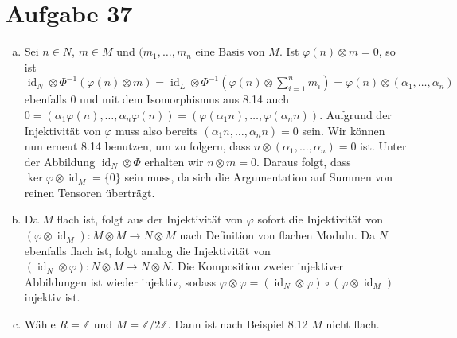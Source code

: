 \documentclass{article}
\theoremstyle{definition}
\newcommand{\Z}{\mathbb{Z}}
\newcommand{\id}{\operatorname{id}}
\begin{document}
\section*{Aufgabe 37}
\begin{enumerate}[(a)]
    \item Sei $n\in N$, $m\in M$ und $(m_1,\dots,m_n$ eine Basis von $M$. Ist $\varphi(n)\otimes m = 0$, so ist $\id_N\otimes\Phi^{-1}(\varphi(n)\otimes m) =  \id_L\otimes\Phi^{-1}(\varphi(n)\otimes \sum_{i = 1}^{n}m_i) = \varphi(n)\otimes (\alpha_1,\dots,\alpha_n)$ ebenfalls $0$ und mit dem Isomorphismus aus 8.14 auch $0 = (\alpha_1 \varphi(n), \dots, \alpha_n \varphi(n)) = (\varphi(\alpha_1 n), \dots, \varphi(\alpha_n n))$. Aufgrund der Injektivität von $\varphi$ muss also bereits $(\alpha_1 n, \dots, \alpha_n n) = 0$ sein. Wir können nun erneut 8.14 benutzen, um zu folgern, dass $n \otimes (\alpha_1,\dots,\alpha_n) = 0$ ist. Unter der Abbildung $\id_N\otimes\Phi$ erhalten wir $n\otimes m = 0$. Daraus folgt, dass $\ker \varphi \otimes \id_M = \{0\}$ sein muss, da sich die Argumentation auf Summen von reinen Tensoren überträgt.
    \item Da $M$ flach ist, folgt aus der Injektivität von $\varphi$ sofort die Injektivität von $(\varphi \otimes \id_M)\colon M\otimes M \to N\otimes M$ nach Definition von flachen Moduln. Da $N$ ebenfalls flach ist, folgt analog die Injektivität von $(\id_N \otimes \varphi)\colon N\otimes M \to N\otimes N$. Die Komposition zweier injektiver Abbildungen ist wieder injektiv, sodass $\varphi \otimes \varphi = (\id_N \otimes \varphi) \circ (\varphi \otimes \id_M)$ injektiv ist.
    \item Wähle $R = \Z$ und $M= \Z /2\Z$. Dann ist nach Beispiel 8.12 $M$ nicht flach.
\end{enumerate}
\end{document}
